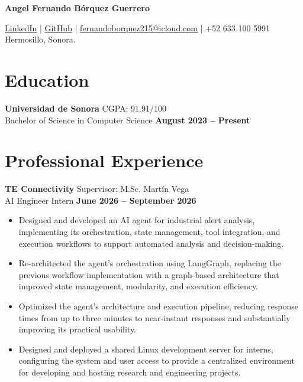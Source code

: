\documentclass[11pt]{article}
\begin{document}
{\Huge \textbf{Angel Fernando Bórquez Guerrero}} \\
\vspace{-0.4cm}
\par \href{https://www.linkedin.com/in/fernandoborquez/}{LinkedIn} \quad | \quad
\href{https://github.com/FernyBoy}{GitHub} \quad | \quad
\href{mailto:fernandoborquez215@icloud.com}{fernandoborquez215@icloud.com} \quad | \quad
+52 633 100 5991 \\
Hermosillo, Sonora.





\section*{Education}
\textbf{Universidad de Sonora} \hfill CGPA: 91.91/100\\
Bachelor of Science in Computer Science \hfill \textbf{August 2023 -- Present}





\section*{Professional Experience}
\textbf{TE Connectivity} \hfill Supervisor: M.Sc. Martín Vega \\
AI Engineer Intern \hfill \textbf{June 2026 -- September 2026}
\vspace{-0.3cm}
\begin{itemize}[leftmargin=*]
    \item Designed and developed an AI agent for industrial alert analysis, implementing its orchestration, state management, tool integration, and execution workflows to support automated analysis and decision-making.

    \vspace{-0.3cm}
    \item Re-architected the agent's orchestration using LangGraph, replacing the previous workflow implementation with a graph-based architecture that improved state management, modularity, and execution efficiency.

    \vspace{-0.3cm}
    \item Optimized the agent's architecture and execution pipeline, reducing response times from up to three minutes to near-instant responses and substantially improving its practical usability.

    \vspace{-0.3cm}
    \item Designed and deployed a shared Linux development server for interns, configuring the system and user access to provide a centralized environment for developing and hosting research and engineering projects.
\end{itemize}
\end{document}
